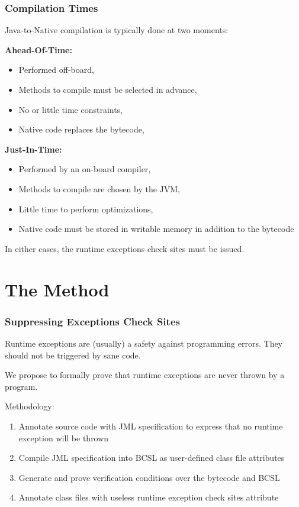 \documentclass{beamer}
\begin{document}
\begin{frame}
\frametitle{Compilation Times}
Java-to-Native compilation is typically done at two moments:

\textbf{Ahead-Of-Time:}
\begin{itemize}
\item Performed off-board,
\item Methods to compile must be selected in advance,
\item No or little time constraints,
\item Native code replaces the bytecode,
\end{itemize}

\textbf{Just-In-Time:}
\begin{itemize}
\item Performed by an on-board compiler,
\item Methods to compile are chosen by the JVM,
\item Little time to perform optimizations,
\item Native code must be stored in writable memory in addition to the bytecode
\end{itemize}

In either cases, the runtime exceptions check sites must be issued.
\end{frame}


\section{The Method}

\begin{frame}
\frametitle{Suppressing Exceptions Check Sites}

Runtime exceptions are (usually) a safety against programming errors. They should not be triggered by sane code.

We propose to formally prove that runtime exceptions are never thrown by a program.

Methodology:
\begin{enumerate}
\item Annotate source code with JML specification to express that no runtime exception will be thrown
\item Compile JML specification into BCSL as user-defined class file attributes
\item Generate and prove verification conditions over the bytecode and BCSL
\item Annotate class files with useless runtime exception check sites attribute
\end{enumerate}
\end{frame}
\end{document}
